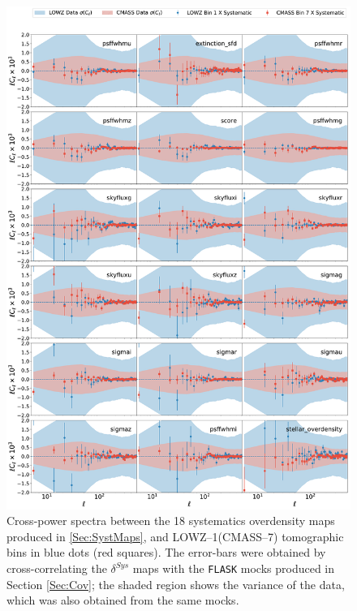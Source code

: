 \begin{figure}
\begin{center}
\includegraphics[width=\textwidth]{BOSS-FIGS/systematics_CMASS_Bin1_LOWZ_Bin1.pdf}
\caption[Cross-power spectra between systematics and LOWZ--1(CMASS--7) tomographic bins.]{Cross-power spectra between the 18 systematics overdensity maps produced in \ref{Sec:SystMaps}, and LOWZ--1(CMASS--7) tomographic bins in blue dots (red squares). The error-bars were obtained by cross-correlating the $\delta^{Sys}$ maps with the \texttt{FLASK} mocks produced in Section \ref{Sec:Cov}; the shaded region shows the variance of the data, which was also obtained from the same mocks.}
\label{fig:SystBin1}
\end{center}
\end{figure}

